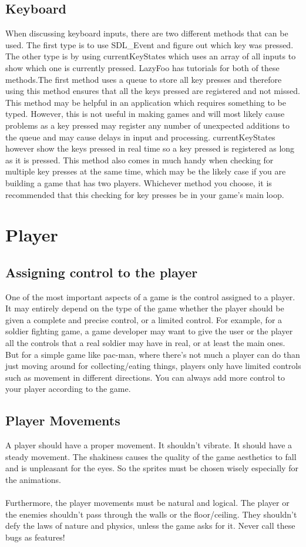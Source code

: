 \documentclass[11pt,fleqn]{book} %
\begin{document}
    \section{Keyboard}
    When discussing keyboard inputs, there are two different methods that can be used. The first type is to use SDL\_Event and figure out which key was pressed. The other type is by using currentKeyStates which uses an array of all inputs to show which one is currently pressed. LazyFoo has tutorials for both of these methods.The first method uses a queue to store all key presses and therefore using this method ensures that all the keys pressed are registered and not missed. This method may be helpful in an application which requires something to be typed. However, this is not useful in making games and will most likely cause problems as a key pressed may register any number of unexpected additions to the queue and may cause delays in input and processing. currentKeyStates however show the keys pressed in real time so a key pressed is registered as long as it is pressed. This method also comes in much handy when checking for multiple key presses at the same time, which may be the likely case if you are building a game that has two players. Whichever method you choose, it is recommended that this checking for key presses be in your game's main loop. 
    
\chapter{Player} %
    \section{Assigning control to the player}
    One of the most important aspects of a game is the control assigned to a player. It may entirely depend on the type of the game whether the player should be given a complete and precise control, or a limited control. For example, for a soldier fighting game, a game developer may want to give the user or the player all the controls that a real soldier may have in real, or at least the main ones. But for a simple game like pac-man, where there's not much a player can do than just moving around for collecting/eating things, players only have limited controls such as movement in different directions. You can always add more control to your player according to the game.
    \section{Player Movements}
    A player should have a proper movement. It shouldn’t vibrate. It should have a steady movement. The shakiness causes the quality of the game aesthetics to fall and is unpleasant for the eyes. So the sprites must be chosen wisely especially for the animations.  \\ \\
    Furthermore, the player movements must be natural and logical. The player or the enemies shouldn’t pass through the walls or the floor/ceiling. They shouldn’t defy the laws of nature and physics, unless the game asks for it. Never call these bugs as features!
\end{document}
